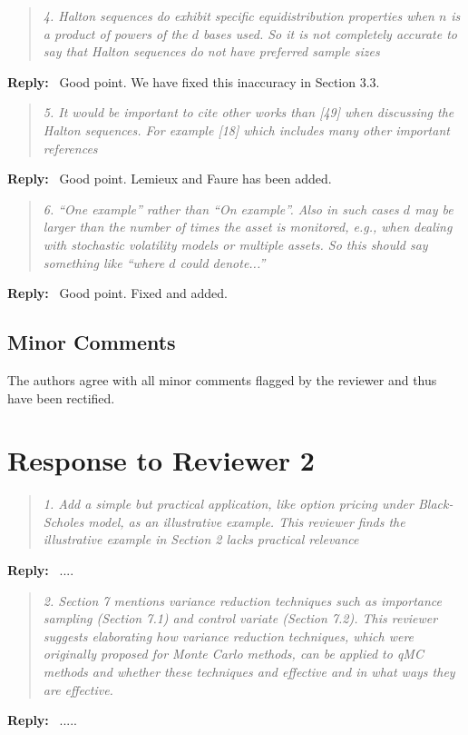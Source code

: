 \documentclass[11pt]{article}
\newenvironment{response}{%
  \vspace{1em}
  \begin{quote}\itshape
}{%
  \end{quote}
  \noindent\textbf{Reply:}~
}
\begin{document}
\begin{response}{4.}
Halton sequences do exhibit specific equidistribution properties when $n$ is a product of powers of the $d$ bases used. So it is not completely accurate to say that Halton sequences do not have preferred sample sizes
\end{response}
Good point. We have fixed this inaccuracy in Section 3.3.



\begin{response}{5.}
    It would be important to cite other works than [49] when discussing the Halton sequences. For example [18] which includes many other important references
\end{response}
Good point. Lemieux and Faure has been added.


\begin{response}{6.}
“One example” rather than “On example”. Also in such cases $d$ may be larger than the number of times the asset is monitored, e.g., when dealing with stochastic volatility models or multiple assets. So this should say something like “where $d$ could denote...”
\end{response}
Good point. Fixed and added.


\subsection*{Minor Comments}

The authors agree with all minor comments  flagged by the reviewer and thus have been rectified.



\newpage

\section*{Response to Reviewer 2}


\begin{response}{1.}
    Add a simple but practical application, like option pricing under Black-Scholes model, as an illustrative example. This reviewer finds the illustrative example in Section 2 lacks practical relevance
\end{response}
....



\begin{response}{2.}
    Section 7 mentions variance reduction techniques such as importance sampling (Section 7.1) and control variate (Section 7.2). This reviewer suggests elaborating how variance reduction techniques, which were originally proposed for Monte Carlo methods, can be applied to qMC methods and whether these techniques and effective and in what ways they are effective.
\end{response}
.....
\end{document}
